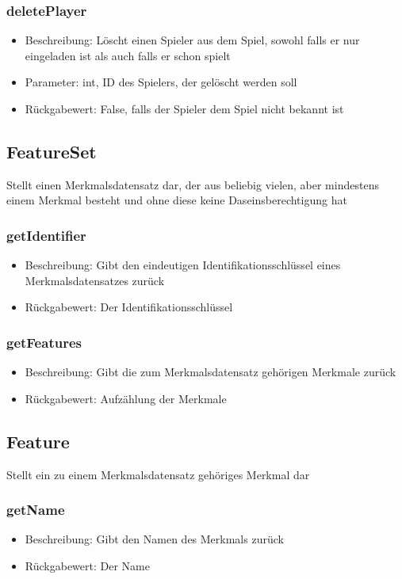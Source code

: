 \documentclass[a4paper]{scrreprt}
\begin{document}
	\subsubsection{deletePlayer}
	\begin{itemize}
		\item Beschreibung: Löscht einen Spieler aus dem Spiel, sowohl falls er nur eingeladen ist als auch falls er schon spielt
		\item Parameter: int, ID des Spielers, der gelöscht werden soll
		\item Rückgabewert: False, falls der Spieler dem Spiel nicht bekannt ist
	\end{itemize}
	
	\subsection{FeatureSet}
	Stellt einen Merkmalsdatensatz dar, der aus beliebig vielen, aber mindestens einem Merkmal besteht und ohne diese keine Daseinsberechtigung hat
	\subsubsection{getIdentifier}
	\begin{itemize}
		\item Beschreibung: Gibt den eindeutigen Identifikationsschlüssel eines Merkmalsdatensatzes zurück
		\item Rückgabewert: Der Identifikationsschlüssel
	\end{itemize}
	\subsubsection{getFeatures}
	\begin{itemize}
		\item Beschreibung: Gibt die zum Merkmalsdatensatz gehörigen Merkmale zurück
		\item Rückgabewert: Aufzählung der Merkmale
	\end{itemize}
	
	\subsection{Feature}
	Stellt ein zu einem Merkmalsdatensatz gehöriges Merkmal dar
	\subsubsection{getName}
	\begin{itemize}
		\item Beschreibung: Gibt den Namen des Merkmals zurück
		\item Rückgabewert: Der Name
	\end{itemize}
\end{document}
